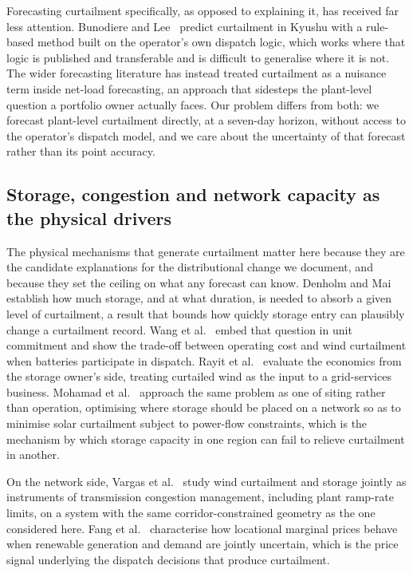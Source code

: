 \documentclass[preprint,3p,times]{elsarticle}
\begin{document}
Forecasting curtailment specifically, as opposed to explaining it, has received far less attention. Bunodiere and Lee~\cite{bunodiere2020} predict curtailment in Kyushu with a rule-based method built on the operator's own dispatch logic, which works where that logic is published and transferable and is difficult to generalise where it is not. The wider forecasting literature has instead treated curtailment as a nuisance term inside net-load forecasting, an approach that sidesteps the plant-level question a portfolio owner actually faces. Our problem differs from both: we forecast plant-level curtailment directly, at a seven-day horizon, without access to the operator's dispatch model, and we care about the uncertainty of that forecast rather than its point accuracy.

\subsection{Storage, congestion and network capacity as the physical drivers}

The physical mechanisms that generate curtailment matter here because they are the candidate explanations for the distributional change we document, and because they set the ceiling on what any forecast can know. Denholm and Mai~\cite{denholm2019} establish how much storage, and at what duration, is needed to absorb a given level of curtailment, a result that bounds how quickly storage entry can plausibly change a curtailment record. Wang et al.~\cite{wang2019} embed that question in unit commitment and show the trade-off between operating cost and wind curtailment when batteries participate in dispatch. Rayit et al.~\cite{rayit2021} evaluate the economics from the storage owner's side, treating curtailed wind as the input to a grid-services business. Mohamad et al.~\cite{mohamad2021} approach the same problem as one of siting rather than operation, optimising where storage should be placed on a network so as to minimise solar curtailment subject to power-flow constraints, which is the mechanism by which storage capacity in one region can fail to relieve curtailment in another.

On the network side, Vargas et al.~\cite{vargas2015} study wind curtailment and storage jointly as instruments of transmission congestion management, including plant ramp-rate limits, on a system with the same corridor-constrained geometry as the one considered here. Fang et al.~\cite{fang2021} characterise how locational marginal prices behave when renewable generation and demand are jointly uncertain, which is the price signal underlying the dispatch decisions that produce curtailment.
\end{document}
